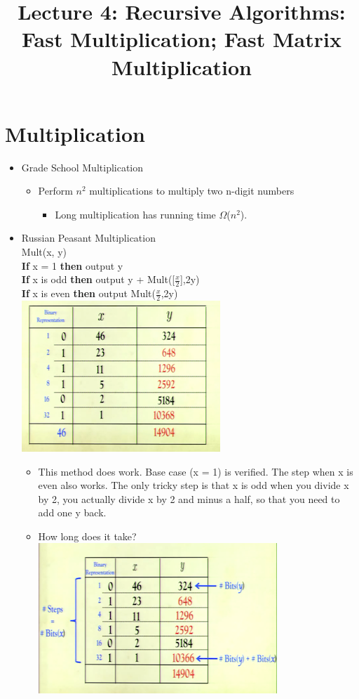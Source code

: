\documentclass[12pt]{article}
\title{\huge Lecture 4: Recursive Algorithms: Fast Multiplication; Fast Matrix Multiplication}
\author{}
\date{}
\begin{document}
\maketitle
\section{Multiplication}
\renewcommand{\labelitemii}{$\circ$}
\renewcommand{\labelitemiii}{$\cdot$}
\renewcommand{\labelitemiii}{$\rightarrow$}
\begin{itemize}
\item{Grade School Multiplication}
	\begin{itemize}
	\item Perform $n^2$ multiplications to multiply two n-digit numbers
		\begin{itemize}
		\item Long multiplication has running time $\Omega$($n^2$).
		\end{itemize}
	\end{itemize}
\item Russian Peasant Multiplication\\
	Mult(x, y)\\
	\textbf{If} x = 1 \textbf{then} output y\\
	\textbf{If} x is odd \textbf{then} output y + Mult([$\frac{x}{2}$],2y)\\
	\textbf{If} x is even \textbf{then} output Mult($\frac{x}{2}$,2y)\\
	\includegraphics{lecture41}
	\begin{itemize}
	\item This method does work. Base case (x = 1) is verified. The step when x is even also works. The only tricky step is that x is odd when you divide x by 2, you actually divide x by 2 and minus a half, so that you need to add one y back.
	\item How long does it take? \\
	\includegraphics{lecture42}

\end{itemize}
\end{itemize}
\end{document}
